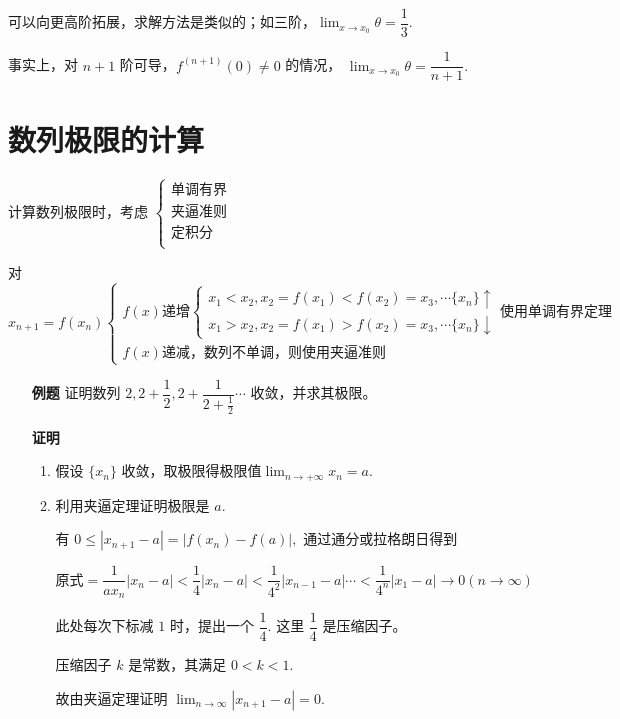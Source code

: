 可以向更高阶拓展，求解方法是类似的；如三阶，$ {\displaystyle\lim_{x\rightarrow x_0}}\theta = \dfrac{1}{3}. $ 

事实上，对 $ n+1 $ 阶可导，$ f^{(n+1)}(0)\neq 0 $ 的情况，
$ {\displaystyle\lim_{x\rightarrow x_0}}\theta = \dfrac{1}{n+1}. $ 


\section{数列极限的计算}

计算数列极限时，考虑
$ \begin{cases}
    \textrm{单调有界}\\
    \textrm{夹逼准则}\\ 
    \textrm{定积分}\\ 
\end{cases} $ 


对 $ x_{n+1}=f(x_n)\begin{cases}
    f(x)\textrm{递增}\begin{cases}
        x_1 < x_2, x_2 = f(x_1) < f(x_2) = x_3,\cdots \{x_n\}\uparrow \\
        x_1 > x_2, x_2 = f(x_1) > f(x_2) = x_3,\cdots \{x_n\}\downarrow
    \end{cases} \textrm{使用单调有界定理}\\ 
    f(x)\textrm{递减，数列不单调，则使用夹逼准则} 
\end{cases} $ 

\begin{enumerate}
    \item[\textbf{例题}] 证明数列 $ 2,2+\dfrac{1}{2},2+\dfrac{1}{2+\frac{1}{2}}\cdots $ 收敛，并求其极限。
    \item[\textbf{证明}] \begin{enumerate}[label = \roman*.]
        \item 假设 $ \{x_n\} $ 收敛，取极限得极限值$ {\displaystyle\lim_{n\rightarrow +\infty}}x_n = a. $ 
        \item {}
        
        利用夹逼定理证明极限是 $ a. $ 

        有 $ 0\leq |x_{n+1} - a| = |f(x_n) - f(a)|, $ 通过通分或拉格朗日得到

        $ \textrm{原式} = \dfrac{1}{ax_n}|x_n-a| < \dfrac{1}{4}|x_n-a| < \dfrac{1}{4^2}|x_{n-1}-a|
        \cdots < \dfrac{1}{4^n}|x_1-a|\rightarrow 0(n\rightarrow\infty) $
        
        此处每次下标减 $ 1 $ 时，提出一个 $ \dfrac{1}{4}. $ 这里 $ \dfrac{1}{4} $ 是压缩因子。
        
        压缩因子 $ k $ 是常数，其满足 $ 0 < k < 1. $ 

        故由夹逼定理证明 $ {\displaystyle\lim_{n\rightarrow \infty}}|x_{n+1} - a| = 0. $ 
    \end{enumerate}
\end{enumerate}

